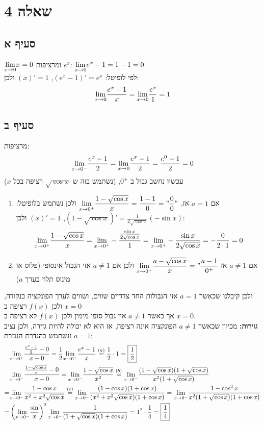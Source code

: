 \documentclass{article}
\begin{document}
	\section*{שאלה 4}
	\subsection*{סעיף א}
	$\displaystyle{\lim_{x \to 0}} x = 0$
	ומרציפות $e^x$: $\displaystyle{\lim_{x \to 0}} e^x - 1 = 1 - 1 = 0$ \\
	לפי לופיטל:
	$(e^x-1)' = e^x$, $(x)' = 1$ ולכן:
	\[ \displaystyle{\lim_{x \to 0}}\frac{e^x-1}{x} = \displaystyle{\lim_{x \to 0}} \frac{e^x}{1} = 1\]

	\subsection*{סעיף ב}
	מרציפות:
	\[ \displaystyle{\lim_{x \to 0^-}} \frac{e^x - 1}{2} = \displaystyle{\lim_{x \to 0}} \frac{e^x -1 }{2} = \frac{e^0 - 1}{2} = 0 \]
	עכשיו נחשב גבול ב $0^+$, (נשתמש בזה ש $\sqrt{\cos x}$ רציפה בכל $x$)
	\begin{enumerate}
		\item אם $a = 1$ אז, $\displaystyle{\lim_{x \to 0^+}} \frac{1 - \sqrt{\cos x}}{x} = \frac{1 - 1}{0} = "\frac{0}{0}"$
		ולכן נשתמש בלופיטל: $(1 - \sqrt{\cos x})' = \frac{1}{2\sqrt{\cos x}}(- \sin x)$, $(x)' = 1$
		ולכן:
		\[
		\displaystyle{\lim_{x \to 0^+}} \frac{1 - \sqrt{\cos x}}{x} = \displaystyle{\lim_{x \to 0^+}} - \frac{\frac{\sin x}{2\sqrt{\cos x}}}{1} = \displaystyle{\lim_{x \to 0^+}} - \frac{\sin x}{2\sqrt{\cos x}} = - \frac{0}{2 \cdot 1} = 0
		\]
		\item אם $a \neq 1$ אז $\displaystyle{\lim_{x \to 0^+}} \frac{a - \sqrt{\cos x}}{x} = "\frac{a - 1}{0^+}$
		ולכן אם $a \neq 1$ אזי הגבול אינסופי (פלוס או מינוס תלוי בערך $a$)
	\end{enumerate}
	ולכן קיבלנו שכאשר $a = 1$ אזי הגבולות החד צדדיים שווים, ושווים לערך הפונקציה בנקודה, ולכן $f(x)$ רציפה ב $x = 0 $\\
	אך כאשר $a \neq 1$ אין גבול סופי מימין ולכן $f(x)$ לא רציפה ב $x = 0$. \\
	\textbf{גזירות:}
	מכיוון שכאשר $a \neq 1$ הפונקציה אינה רציפה, אז היא לא יכולה להיות גזירה, ולכן נציב $a = 1$ ונשתמש בהגדרת הנגזרת:
	\begin{align*}
		&\displaystyle{\lim_{x \to 0^+}} \frac{\frac{e^x - 1}{2} - 0}{x - 0}
		= \frac{1}{2}\displaystyle{\lim_{x \to 0^+}}\frac{e^x-1}{x}
		\overset{(a)}= \frac{1}{2} \cdot 1
		= \boxed{\frac{1}{2}} \\
		&\displaystyle{\lim_{x \to 0^-}} \frac{\frac{1 - \sqrt{\cos x}}{x} - 0}{x  - 0}
		= \displaystyle{\lim_{x \to 0^-}} \frac{1 - \sqrt{\cos x}}{x^2}
		\overset{(b)}= \displaystyle{\lim_{x \to 0^-}} \frac{(1 - \sqrt{\cos x})(1+\sqrt{\cos x})}{x^2(1 + \sqrt{\cos x})} \\
		= &\displaystyle{\lim_{x \to 0^-}} \frac{1 - \cos x}{x^2 + x^2\sqrt{\cos x}}
		\overset{(c)}= \displaystyle{\lim_{x \to 0^-}} \frac{(1 - \cos x)(1 + \cos x)}{(x^2 + x^2\sqrt{\cos x})(1+\cos x)}
		= \displaystyle{\lim_{x \to 0^-}} \frac{1 - \cos^2 x}{x^2(1 + \sqrt{\cos x})(1 + \cos x)}\\
		= &\left( \displaystyle{\lim_{x \to 0^-}} \frac{\sin}{x} \right)^2 \displaystyle{\lim_{x \to 0^-}} \frac{1}{(1 + \sqrt{\cos x})(1 + \cos x)}
		= 1^2 \cdot \frac{1}{4} = \boxed{\frac{1}{4}}
	\end{align*}
\end{document}
